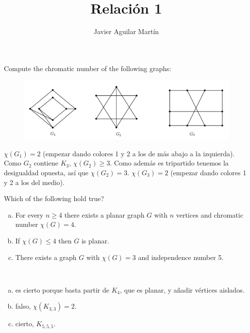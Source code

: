 \documentclass[twoside]{article}
\begin{document}
\title{Relación 1}
\author{Javier Aguilar Martín}
\maketitle


\begin{ejercicio}{3.1}
Compute the chromatic number of the following graphs:

\begin{figure}[h!]
\includegraphics[scale=0.7]{grafos31}
\end{figure}
\end{ejercicio}
\begin{solucion}
$\chi(G_1)=2$ (empezar dando colores 1 y 2 a los de más abajo a la izquierda). Como $G_2$ contiene $K_3$, $\chi(G_2)\geq 3$. Como además es tripartido tenemos la desigualdad opuesta, así que $\chi(G_2)=3$. $\chi(G_3)=2$ (empezar dando colores 1 y 2 a los del medio). 
\end{solucion}

\newpage


\begin{ejercicio}{3.2}
Which of the following hold true?
\begin{enumerate}[a)]
\item For every $n ≥ 4$ there exists a planar graph $G$ with $n$ vertices and chromatic
number $χ(G) = 4$.
\item If $χ(G) ≤ 4$ then $G$ is planar.
\item There exists a graph $G$ with $χ(G) = 3$ and independence number 5.
\end{enumerate}
\end{ejercicio}
\begin{solucion}\
\begin{enumerate}[a)]
\item es cierto porque basta partir de $K_4$, que es planar, y añadir vértices aislados.
\item falso, $\chi(K_{3,3})=2$. 
\item cierto, $K_{5,5,5}$.  
\end{enumerate}

\end{solucion}
\end{document}
